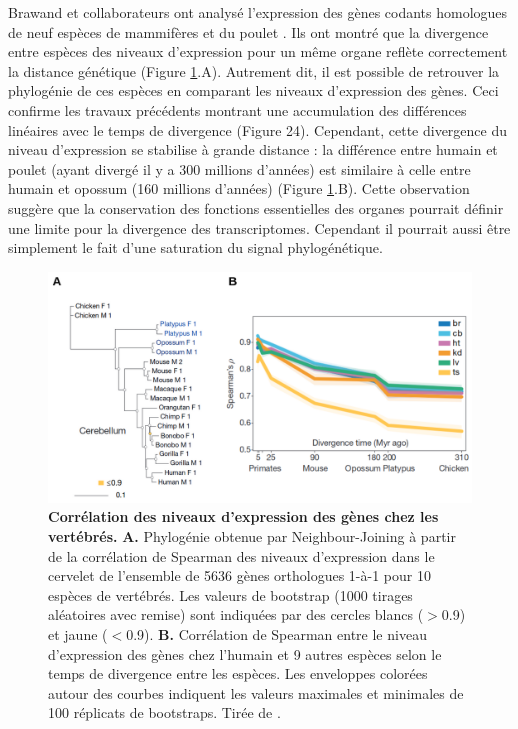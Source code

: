 Brawand et collaborateurs ont analysé l’expression des gènes codants homologues de neuf espèces de mammifères et du poulet \citep{brawand_evolution_2011}. Ils ont montré que la divergence entre espèces des niveaux d’expression pour un même organe reflète correctement la distance génétique (Figure \ref{fig:Fig26}.A). Autrement dit, il est possible de retrouver la phylogénie de ces espèces en comparant les niveaux d’expression des gènes. Ceci confirme les travaux précédents montrant une accumulation des différences linéaires avec le temps de divergence (Figure 24). Cependant, cette divergence du niveau d’expression se stabilise à grande distance : la différence entre humain et poulet (ayant divergé il y a 300 millions d’années) est similaire à celle entre humain et opossum (160 millions d’années) (Figure \ref{fig:Fig26}.B). Cette observation suggère que la conservation des fonctions essentielles des organes pourrait définir une limite pour la divergence des transcriptomes. Cependant il pourrait aussi être simplement le fait d’une saturation du signal phylogénétique. 

\begin{figure}[h]
    \centering
    \includegraphics[width=1\textwidth, page=1] {figures/introduction/fig26.png}
    \caption[Corrélation des niveaux d'expression des gènes chez les vertébrés.]{
    \textbf{Corrélation des niveaux d'expression des gènes chez les vertébrés.}
    \textbf{A.} Phylogénie obtenue par Neighbour-Joining à partir de la corrélation de Spearman des niveaux d'expression dans le cervelet de l'ensemble de 5636 gènes orthologues 1-à-1 pour 10 espèces de vertébrés. Les valeurs de bootstrap (1000 tirages aléatoires avec remise) sont indiquées par des cercles blancs ($>$0.9) et jaune ($<$0.9).
    \textbf{B.} Corrélation de Spearman entre le niveau d'expression des gènes chez l'humain et 9 autres espèces selon le temps de divergence entre les espèces. Les enveloppes colorées autour des courbes indiquent les valeurs maximales et minimales de 100 réplicats de bootstraps. Tirée de \citep{brawand_evolution_2011}. \\
    }
    \label{fig:Fig26}
\end{figure} 

